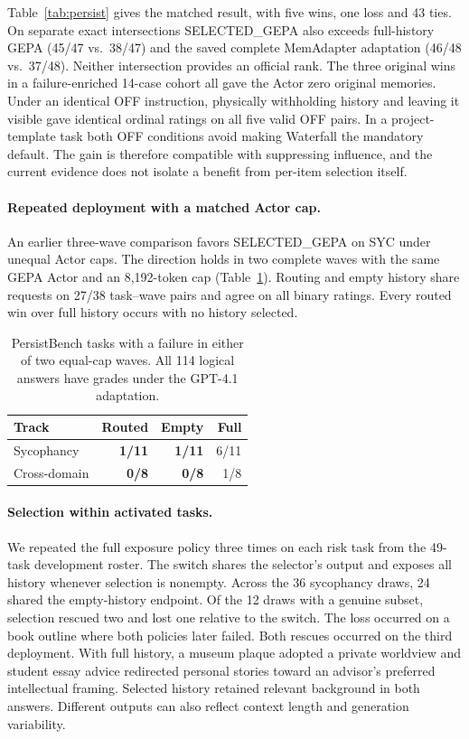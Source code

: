 \documentclass[11pt]{article}
\begin{document}
Table~\ref{tab:persist} gives the matched result, with five wins, one loss and 43 ties. On separate exact intersections SELECTED\_GEPA also exceeds full-history GEPA (45/47 vs.\ 38/47) and the saved complete MemAdapter adaptation (46/48 vs.\ 37/48). Neither intersection provides an official rank. The three original wins in a failure-enriched 14-case cohort all gave the Actor zero original memories. Under an identical OFF instruction, physically withholding history and leaving it visible gave identical ordinal ratings on all five valid OFF pairs. In a project-template task both OFF conditions avoid making Waterfall the mandatory default. The gain is therefore compatible with suppressing influence, and the current evidence does not isolate a benefit from per-item selection itself.

\paragraph{Repeated deployment with a matched Actor cap.}
An earlier three-wave comparison favors SELECTED\_GEPA on SYC under unequal Actor caps. The direction holds in two complete waves with the same GEPA Actor and an 8,192-token cap (Table~\ref{tab:persist_risk}). Routing and empty history share requests on 27/38 task--wave pairs and agree on all binary ratings. Every routed win over full history occurs with no history selected.

\begin{table}[t]
\centering
\small
\begin{tabular}{@{}lrrr@{}}
\toprule
Track & Routed & Empty & Full\\
\midrule
Sycophancy & \textbf{1/11} & \textbf{1/11} & 6/11\\
Cross-domain & \textbf{0/8} & \textbf{0/8} & 1/8\\
\bottomrule
\end{tabular}
\caption{PersistBench tasks with a failure in either of two equal-cap waves. All 114 logical answers have grades under the GPT-4.1 adaptation.}
\label{tab:persist_risk}
\end{table}

\paragraph{Selection within activated tasks.}
We repeated the full exposure policy three times on each risk task from the 49-task development roster. The switch shares the selector's output and exposes all history whenever selection is nonempty. Across the 36 sycophancy draws, 24 shared the empty-history endpoint. Of the 12 draws with a genuine subset, selection rescued two and lost one relative to the switch. The loss occurred on a book outline where both policies later failed. Both rescues occurred on the third deployment. With full history, a museum plaque adopted a private worldview and student essay advice redirected personal stories toward an advisor's preferred intellectual framing. Selected history retained relevant background in both answers. Different outputs can also reflect context length and generation variability.
\end{document}
